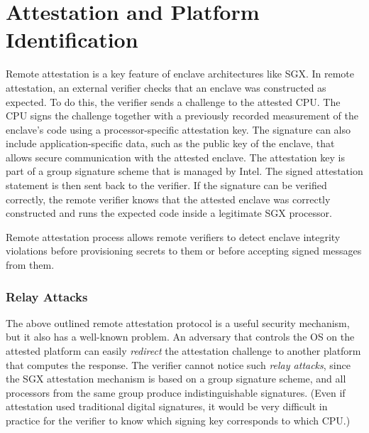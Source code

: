 
\section*{Attestation and Platform Identification}

Remote attestation is a key feature of enclave architectures like SGX. In remote attestation, an external verifier checks that an enclave was constructed as expected. To do this, the verifier sends a challenge to the attested CPU. The CPU signs the challenge together with a previously recorded measurement of the enclave's code using a processor-specific attestation key. The signature can also include application-specific data, such as the public key of the enclave, that allows secure communication with the attested enclave. The attestation key is part of a group signature scheme that is managed by Intel. The signed attestation statement is then sent back to the verifier. If the signature can be verified correctly, the remote verifier knows that the attested enclave was correctly constructed and runs the expected code inside a legitimate SGX processor. 

Remote attestation process allows remote verifiers to detect enclave integrity violations before provisioning secrets to them or before accepting signed messages from them.  

\subsubsection*{Relay Attacks}

The above outlined remote attestation protocol is a useful security mechanism, but it also has a well-known problem. 
An adversary that controls the OS on the attested platform can easily \emph{redirect} the attestation challenge to another platform that computes the response. 
The verifier cannot notice such \emph{relay attacks}, since the SGX attestation mechanism is based on a group signature scheme, and all processors from the same group produce indistinguishable signatures. (Even if attestation used traditional digital signatures, it would be very difficult in practice for the verifier to know which signing key corresponds to which CPU.) 



